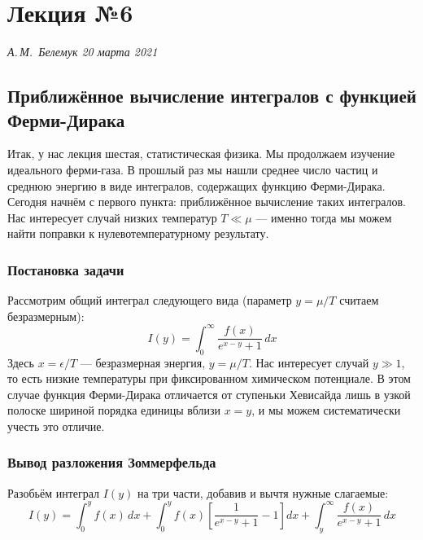 \documentclass[../general/general]{subfiles}
\begin{document}
\chapter{Лекция №6}
\noindent\textit{А.\,М.~Белемук \hfill 20 марта 2021}
\vspace{1em}
\ifSubfilesClassLoaded{\tableofcontents\newpage}{}


\section{Приближённое вычисление интегралов с функцией Ферми-Дирака}

Итак, у нас лекция шестая, статистическая физика. Мы продолжаем изучение идеального ферми-газа. В прошлый раз мы нашли среднее число частиц и среднюю энергию в виде интегралов, содержащих функцию Ферми-Дирака. Сегодня начнём с первого пункта: приближённое вычисление таких интегралов. Нас интересует случай низких температур $T \ll \mu$ — именно тогда мы можем найти поправки к нулевотемпературному результату.

\subsection{Постановка задачи}

Рассмотрим общий интеграл следующего вида (параметр $y = \mu/T$ считаем безразмерным):
\begin{equation}
    I(y) = \int_0^\infty \frac{f(x)}{e^{x - y} + 1}\, dx
\end{equation}
Здесь $x = \epsilon/T$ --- безразмерная энергия, $y = \mu/T$. Нас интересует случай $y \gg 1$, то есть низкие температуры при фиксированном химическом потенциале. В этом случае функция Ферми-Дирака отличается от ступеньки Хевисайда лишь в узкой полоске шириной порядка единицы вблизи $x = y$, и мы можем систематически учесть это отличие.

\subsection{Вывод разложения Зоммерфельда}

Разобьём интеграл $I(y)$ на три части, добавив и вычтя нужные слагаемые:
\begin{equation}
    I(y) = \int_0^y f(x)\, dx + \int_0^y f(x)\!\left[\frac{1}{e^{x-y}+1} - 1\right] dx + \int_y^\infty \frac{f(x)}{e^{x-y}+1}\, dx
\end{equation}
\end{document}
